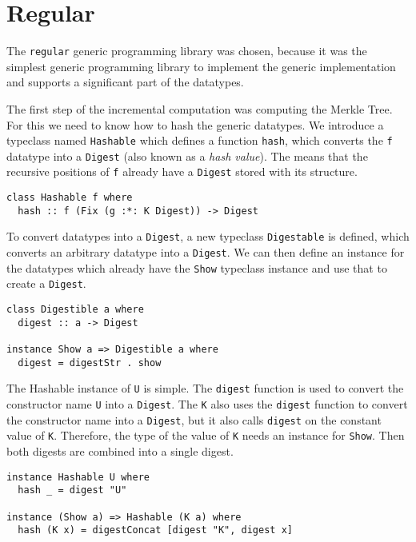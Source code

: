 \section{Regular}

The \texttt{regular} generic programming library was chosen, because it was the simplest generic programming library to implement the generic implementation and supports a significant part of the datatypes.


The first step of the incremental computation was computing the Merkle Tree. For this we need to know how to hash the generic datatypes. We introduce a typeclass named \texttt{Hashable} which defines a function \texttt{hash}, which converts the \texttt{f} datatype into a \texttt{Digest} (also known as a \textit{hash value}). The  means that the recursive positions of \texttt{f} already have a \texttt{Digest} stored with its structure. 

\begin{verbatim}
class Hashable f where
  hash :: f (Fix (g :*: K Digest)) -> Digest
\end{verbatim}

To convert datatypes into a \texttt{Digest}, a new typeclass \texttt{Digestable} is defined, which converts an arbitrary datatype into a \texttt{Digest}. We can then define an instance for the datatypes which already have the \texttt{Show} typeclass instance and use that to create a \texttt{Digest}.

\begin{verbatim}
class Digestible a where
  digest :: a -> Digest

instance Show a => Digestible a where
  digest = digestStr . show
\end{verbatim}

The Hashable instance of \texttt{U} is simple. The \texttt{digest} function is used to convert the constructor name \texttt{U} into a \texttt{Digest}. The \texttt{K} also uses the \texttt{digest} function to convert the constructor name into a \texttt{Digest}, but it also calls \texttt{digest} on the constant value of \texttt{K}. Therefore, the type of the value of \texttt{K} needs an instance for \texttt{Show}. Then both digests are combined into a single digest. 

\begin{verbatim}
instance Hashable U where
  hash _ = digest "U"

instance (Show a) => Hashable (K a) where
  hash (K x) = digestConcat [digest "K", digest x]
\end{verbatim}

